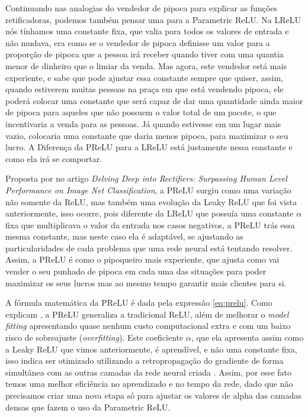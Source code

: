 Continuando nas analogias do vendedor de pipoca para explicar as funções retificadoras, podemos também pensar uma para a Parametric ReLU. Na LReLU nós tínhamos uma constante fixa, que valia para todos os valores de entrada e não mudava, era como se o vendedor de pipoca definisse um valor para a proporção de pipoca que a pessoa irá receber quando tiver com uma quantia menor de dinheiro que o limiar da venda. Mas agora, este vendedor está mais experiente, e sabe que pode ajustar essa constante sempre que quiser, assim, quando estiverem muitas pessoas na praça em que está vendendo pipoca, ele poderá colocar uma constante que será capaz de dar uma quantidade ainda maior de pipoca para aqueles que não possuem o valor total de um pacote, o que incentivaria a venda para as pessoas. Já quando estivesse em um lugar mais vazio, colocaria uma constante que daria menos pipoca, para maximizar o seu lucro. A Diferença da PReLU para a LReLU está justamente nessa constante e como ela irá se comportar.

Proposta por \textcite{PReLUArticle} no artigo \textit{Delving Deep into Rectifiers: Surpassing Human Level Performance on Image Net Classification}, a PReLU surgiu como uma variação não somente da ReLU, mas também uma evolução da Leaky ReLU que foi vista anteriormente, isso ocorre, pois diferente da LReLU que possuía uma constante $\alpha$ fixa que multiplicava o valor da entrada nos casos negativos, a PReLU trás essa mesma constante, mas neste caso ela é adaptável, se ajustando as particularidades de cada problema que uma rede neural está tentando resolver. Assim, a PReLU é como o pipoqueiro mais experiente, que ajusta como vai vender o seu punhado de pipoca em cada uma das situações para poder maximizar os seus lucros mas ao mesmo tempo garantir mais clientes para si.

A fórmula matemática da PReLU é dada pela expressão \ref{eq:prelu}. Como explicam \textcite{PReLUArticle}, a PReLU generaliza a tradicional ReLU, além de melhorar o \textit{model fitting} apresentando quase nenhum custo computacional extra e com um baixo risco de sobreajuste (\textit{overfitting}). Este coeficiente $\alpha$, que ela apresenta assim como a Leaky ReLU que vimos anteriormente, é aprendível, e não uma constante fixa, isso indica ser otimizado utilizando a retropropagação do gradiente de forma simultânea com as outras camadas da rede neural criada \parencite{PReLUArticle}. Assim, por esse fato temos uma melhor eficiência no aprendizado e no tempo da rede, dado que não precisamos criar uma nova etapa só para ajustar os valores de alpha das camadas densas que fazem o uso da Parametric ReLU.

